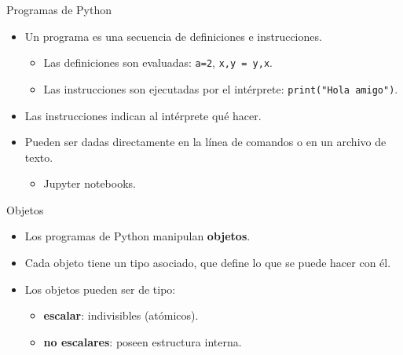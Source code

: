 \documentclass[mathserif]{beamer}
\begin{document}
\begin{frame}{Programas de Python}
    \begin{itemize}
        \item Un programa es una secuencia de {\blue definiciones} e {\blue instrucciones}.
            \begin{itemize}
                \item Las definiciones son {\orange evaluadas}: \lstinline|a=2|, \lstinline|x,y = y,x|.
                \item Las instrucciones son {\orange ejecutadas} por el intérprete: \lstinline|print("Hola amigo")|.
            \end{itemize}
            
        \item Las instrucciones indican al intérprete {\blue qué hacer}.
        
        \item Pueden ser dadas directamente en la {\blue línea de comandos} o en un {\blue archivo} de texto.
            \begin{itemize}
                \item Jupyter notebooks.
            \end{itemize}
    \end{itemize}
\end{frame}

\begin{frame}{Objetos}
    \begin{itemize}
        \item Los programas de Python manipulan {\bfseries\blue objetos}.
        
        \item Cada objeto tiene un tipo asociado, que define lo que se puede hacer con él.
        
        \item Los objetos pueden ser de tipo: 
        \begin{itemize}
            \item {\bfseries\orange escalar}: indivisibles (atómicos). 
            \item {\bfseries\orange no escalares}: poseen estructura interna.
        \end{itemize}
    \end{itemize}
\end{frame}
\end{document}

